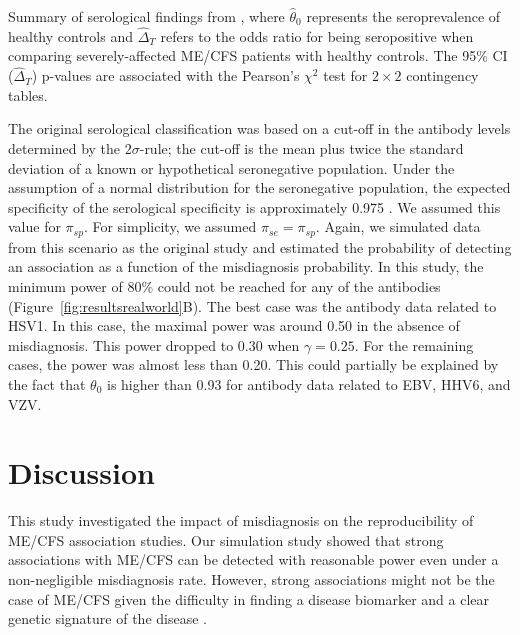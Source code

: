 \begin{table}[h]
\centering
  \caption[Summary of serological findings from \citet{cliff2019CellularImmune}]{Summary of serological findings from \citet{cliff2019CellularImmune}, where $\hat \theta_0$ represents the seroprevalence of healthy controls and $\hat \Delta_T$ refers to the odds ratio for being seropositive when comparing severely-affected ME/CFS patients with healthy controls. The 95\% CI ($\hat \Delta_T$) p-values are associated with the Pearson's $\chi^2$ test for $2 \times 2$ contingency tables.}
    
    \label{tab:serology-parameters}
\end{table}

The original serological classification was based on a cut-off in the antibody levels determined by the $2\sigma$-rule; the cut-off is the mean plus twice the standard deviation of a known or hypothetical seronegative population. Under the assumption of a normal distribution for the seronegative population, the expected specificity of the serological specificity is approximately 0.975 \citep{domingues2021AnalysisAntibody}. We assumed this value for $\pi_{sp}$. For simplicity, we assumed $\pi_{se} = \pi_{sp}$. Again, we simulated data from this scenario as the original study and estimated the probability of detecting an association as a function of the misdiagnosis probability. In this study, the minimum power of 80\% could not be reached for any of the antibodies (Figure~\ref{fig:resultsrealworld}B). The best case was the antibody data related to HSV1. In this case, the maximal power was around 0.50 in the absence of misdiagnosis. This power dropped to 0.30 when $\gamma = 0.25$. For the remaining cases, the power was almost less than 0.20. This could partially be explained by the fact that $\theta_0$ is higher than 0.93 for antibody data related to EBV, HHV6, and VZV.

\section{Discussion}
\label{sec:2023-misdiagnosis-discussion}

This study investigated the impact of misdiagnosis on the reproducibility of ME/CFS association studies. Our simulation study showed that strong associations with ME/CFS can be detected with reasonable power even under a non-negligible misdiagnosis rate. However, strong associations might not be the case of ME/CFS given the difficulty in finding a disease biomarker \citep{scheibenbogen2017EuropeanME} and a clear genetic signature of the disease \citep{herrera2018GenomeepigenomeInteractions, tanigawa2019ComponentsGenetic, dibble2020GeneticRisk, hajdarevic2022GeneticAssociation}.

